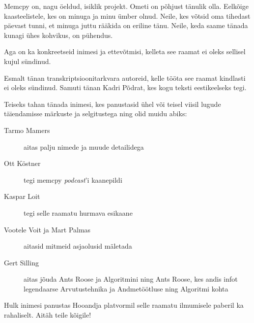 Memcpy on, nagu öeldud, isiklik projekt. Ometi on põhjust tänulik olla. 
Eelkõige kaasteelistele, kes on minuga ja minu ümber olnud. Neile, kes võtsid 
oma tihedast päevast tunni, et minuga juttu rääkida on eriline tänu. Neile, keda saame tänada
kunagi ühes kohvikus, on pühendus.

Aga on ka konkreetseid inimesi ja ettevõtmisi, kelleta see raamat ei oleks sellisel kujul sündinud. 

Esmalt tänan transkriptsioonitarkvara autoreid, kelle tööta see raamat kindlasti ei oleks sündinud. Samuti tänan Kadri Põdrat, kes kogu teksti eestikeelseks tegi. 

Teiseks tahan tänada inimesi, kes panustasid ühel või teisel viisil lugude täiendamisse märkuste ja selgitustega ning olid muidu abiks:

\begin{description}
	\item[Tarmo Mamers] aitas palju nimede ja muude detailidega
	\item[Ott Köstner] tegi memcpy \emph{podcast}'i kaanepildi
	\item[Kaspar Loit] tegi selle raamatu hurmava esikaane
	\item[Vootele Voit ja Mart Palmas]  aitasid mitmeid asjaolusid mäletada 
	\item[Gert Silling] aitas jõuda Ants Roose ja Algoritmini ning Ants Roose, kes andis infot legendaarse Arvutustehnika ja Andmetöötluse ning Algoritmi kohta 
\end{description}

Hulk inimesi panustas Hooandja platvormil selle raamatu ilmumisele paberil ka rahaliselt. Aitäh teile kõigile!

